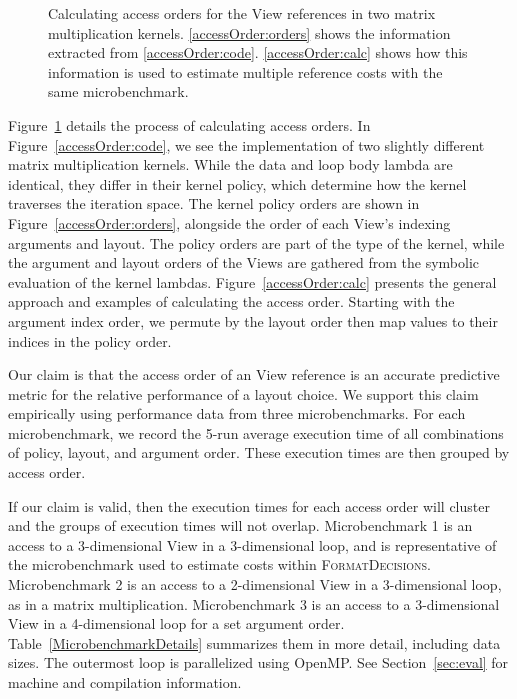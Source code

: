 \documentclass[sigconf,review=true]{acmart}
\newcommand{\FormatDecisions}[0]{{\textsc{FormatDecisions}}}
\begin{document}
\begin{figure}
	
	\caption{Calculating access orders for the View references in two matrix multiplication kernels. \ref{accessOrder:orders} shows the information extracted from \ref{accessOrder:code}. \ref{accessOrder:calc} shows how this information is used to estimate multiple reference costs with the same microbenchmark. }
	\label{accessOrder}
\end{figure}


Figure~\ref{accessOrder} details the process of calculating access orders. 
In Figure~\ref{accessOrder:code}, we see the implementation of two slightly different matrix multiplication kernels. 
While the data and loop body lambda are identical, they differ in their kernel policy, which determine how the kernel traverses the iteration space.
The kernel policy orders are shown in Figure~\ref{accessOrder:orders}, alongside the order of each View's indexing arguments and layout.
The policy orders are part of the type of the kernel, while the argument and layout orders of the Views are gathered from the symbolic evaluation of the kernel lambdas.
Figure~\ref{accessOrder:calc} presents the general approach and examples of calculating the access order.
Starting with the argument index order, we permute by the layout order then map values to their indices in the policy order.

Our claim is that the access order of an View reference is an accurate predictive metric for the relative performance of a layout choice.
We support this claim empirically using performance data from three microbenchmarks.
For each microbenchmark, we record the 5-run average execution time of all combinations of policy, layout, and argument order. 
These execution times are then grouped by access order.

If our claim is valid, then the execution times for each access order will cluster and the groups of execution times will not overlap.
Microbenchmark 1 is an access to a 3-dimensional View in a 3-dimensional loop, and is representative of the microbenchmark used to estimate costs within \FormatDecisions. 
Microbenchmark 2 is an access to a 2-dimensional View in a 3-dimensional loop, as in a matrix multiplication.
Microbenchmark 3 is an access to a 3-dimensional View in a 4-dimensional loop for a set argument order.
Table~\ref{MicrobenchmarkDetails} summarizes them in more detail, including data sizes.
The outermost loop is parallelized using OpenMP.
See Section~\ref{sec:eval} for machine and compilation information.
\end{document}
